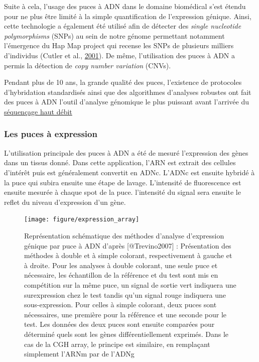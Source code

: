 \documentclass[12pt,twoside]{reedthesis}
\theoremstyle{definition}
\theoremstyle{definition}
\theoremstyle{remark}
\begin{document}
  Suite à cela, l'usage des puces à ADN dans le domaine biomédical s'est
  étendu pour ne plus être limité à la simple quantification de
  l'expression génique. Ainsi, cette technologie a également été utilisé
  afin de détecter des \emph{single nucleotide polymorphisms} (SNPs) au
  sein de notre génome permettant notamment l'émergence du Hap Map project
  qui recense les SNPs de plusieurs milliers d'individus (Cutler et al.,
  \protect\hyperlink{ref-Cutler2001}{2001}). De même, l'utilisation des
  puces à ADN a permis la détection de \emph{copy number variation}
  (CNVs).
  
  Pendant plus de 10 ans, la grande qualité des puces, l'existence de
  protocoles d'hybridation standardisés ainsi que des algorithmes
  d'analyses robustes ont fait des puces à ADN l'outil d'analyse génomique
  le plus puissant avant l'arrivée du \protect\hyperlink{ngs}{séquençage
  haut débit}
  
  \newpage
  
  \subsubsection{Les puces à expression}\label{les-puces-a-expression}
  
  L'utilisation principale des puces à ADN a été de mesuré l'expression
  des gènes dans un tissus donné. Dans cette application, l'ARN est
  extrait des cellules d'intérêt puis est généralement convertit en ADNc.
  L'ADNc est ensuite hybridé à la puce qui subira ensuite une étape de
  lavage. L'intensité de fluorescence est ensuite mesurée à chaque spot de
  la puce. l'intensité du signal sera ensuite le reflet du niveau
  d'expression d'un gène.
  
  \begin{figure}
  
  {\centering \texttt{[image: figure/expression\_array]} 
  
  }
  
  \caption[Représentation schématique des méthodes d'analyse d'expression génique par puce à ADN]{Représentation schématique des méthodes d'analyse d'expression génique par puce à ADN d'après [@Trevino2007] : Présentation des méthodes à double et à simple colorant, respectivement à gauche et à droite. Pour les analyses à double colorant, une seule puce et nécessaire, les échantillon de la référence et du test sont mis en compétition sur la même puce, un signal de sortie vert indiquera une surexpression chez le test tandis qu'un signal rouge indiquera une sous-expression. Pour celles à simple colorant, deux puces sont nécessaires, une première pour la référence et une seconde pour le test. Les données des deux puces sont ensuite comparées pour déterminé quels sont les gènes différentiellement exprimés. Dans le cas de la CGH array, le principe est similaire, en remplaçant simplement l'ARNm par de l'ADNg}\label{fig:figexparray}
  \end{figure}
  
\end{document}
